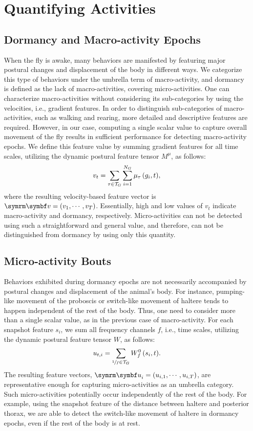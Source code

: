 
\section{Quantifying Activities}
\subsection{Dormancy and Macro-activity Epochs}
When the fly is awake, many behaviors are manifested by featuring major postural changes and displacement of the body in different ways.
We categorize this type of behaviors under the umbrella term of macro-activity, and dormancy is defined as the lack of macro-activities, covering micro-activities.
One can characterize macro-activities without considering its sub-categories by using the velocities, i.e., gradient features.
In order to distinguish sub-categories of macro-activities, such as walking and rearing, more detailed and descriptive features are required.
However, in our case, computing a single scalar value to capture overall movement of the fly results in sufficient performance for detecting macro-activity epochs. We define this feature value by summing gradient features for all time scales, utilizing the dynamic postural feature tensor $M^\mu$, as follows:
\begin{equation}
	v_t = \sum_{\tau \in \mathcal{T}_G}{\sum_{i=1}^{N_G}{\mu_\tau\left(g_i,t\right)}},
\end{equation}
where the resulting velocity-based feature vector is $\V{v}=\rbr{v_1, \cdots, v_T}$. Essentially, high and low values of $v_t$ indicate macro-activity and dormancy, respectively. Micro-activities can not be detected using such a straightforward and general value, and therefore, can not be distinguished from dormancy by using only this quantity.

\subsection{Micro-activity Bouts}
Behaviors exhibited during dormancy epochs are not necessarily accompanied by postural changes and displacement of the animal's body.
For instance, pumping-like movement of the proboscis or switch-like movement of haltere tends to happen independent of the rest of the body.
Thus, one need to consider more than a single scalar value, as in the previous case of macro-activity.
For each snapshot feature $s_i$, we sum all frequency channels $f$, i.e., time scales, utilizing the dynamic postural feature tensor $W$, as follows:
\begin{equation}
	u_{t,i} = \sum_{\sfrac{1}{f} \in \mathcal{T}_G}{W_f^0\left(s_i,t\right)}.
\end{equation}
The resulting feature vectors, $\V{u}_i=\rbr{u_{i,1}, \cdots, u_{i,T}}$, are representative enough for capturing micro-activities as an umbrella category.
Such micro-activities potentially occur independently of the rest of the body.
For example, using the snapshot feature of the distance between haltere and posterior thorax, we are able to detect the switch-like movement of haltere in dormancy epochs, even if the rest of the body is at rest.

